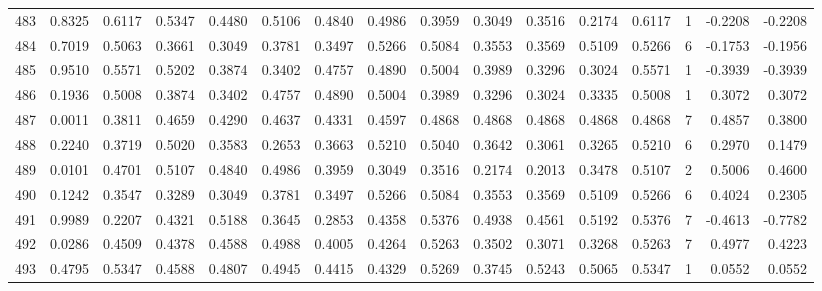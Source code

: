 \begin{tabular}{lrrrrrrrrrrrrrrr}
483 &      0.8325 &  0.6117 &  0.5347 &  0.4480 &  0.5106 &  0.4840 &  0.4986 &  0.3959 &  0.3049 &  0.3516 &   0.2174 &     0.6117 &      1 &                   -0.2208 &                    -0.2208 \\
484 &      0.7019 &  0.5063 &  0.3661 &  0.3049 &  0.3781 &  0.3497 &  0.5266 &  0.5084 &  0.3553 &  0.3569 &   0.5109 &     0.5266 &      6 &                   -0.1753 &                    -0.1956 \\
485 &      0.9510 &  0.5571 &  0.5202 &  0.3874 &  0.3402 &  0.4757 &  0.4890 &  0.5004 &  0.3989 &  0.3296 &   0.3024 &     0.5571 &      1 &                   -0.3939 &                    -0.3939 \\
486 &      0.1936 &  0.5008 &  0.3874 &  0.3402 &  0.4757 &  0.4890 &  0.5004 &  0.3989 &  0.3296 &  0.3024 &   0.3335 &     0.5008 &      1 &                    0.3072 &                     0.3072 \\
487 &      0.0011 &  0.3811 &  0.4659 &  0.4290 &  0.4637 &  0.4331 &  0.4597 &  0.4868 &  0.4868 &  0.4868 &   0.4868 &     0.4868 &      7 &                    0.4857 &                     0.3800 \\
488 &      0.2240 &  0.3719 &  0.5020 &  0.3583 &  0.2653 &  0.3663 &  0.5210 &  0.5040 &  0.3642 &  0.3061 &   0.3265 &     0.5210 &      6 &                    0.2970 &                     0.1479 \\
489 &      0.0101 &  0.4701 &  0.5107 &  0.4840 &  0.4986 &  0.3959 &  0.3049 &  0.3516 &  0.2174 &  0.2013 &   0.3478 &     0.5107 &      2 &                    0.5006 &                     0.4600 \\
490 &      0.1242 &  0.3547 &  0.3289 &  0.3049 &  0.3781 &  0.3497 &  0.5266 &  0.5084 &  0.3553 &  0.3569 &   0.5109 &     0.5266 &      6 &                    0.4024 &                     0.2305 \\
491 &      0.9989 &  0.2207 &  0.4321 &  0.5188 &  0.3645 &  0.2853 &  0.4358 &  0.5376 &  0.4938 &  0.4561 &   0.5192 &     0.5376 &      7 &                   -0.4613 &                    -0.7782 \\
492 &      0.0286 &  0.4509 &  0.4378 &  0.4588 &  0.4988 &  0.4005 &  0.4264 &  0.5263 &  0.3502 &  0.3071 &   0.3268 &     0.5263 &      7 &                    0.4977 &                     0.4223 \\
493 &      0.4795 &  0.5347 &  0.4588 &  0.4807 &  0.4945 &  0.4415 &  0.4329 &  0.5269 &  0.3745 &  0.5243 &   0.5065 &     0.5347 &      1 &                    0.0552 &                     0.0552 \\

\end{tabular}
